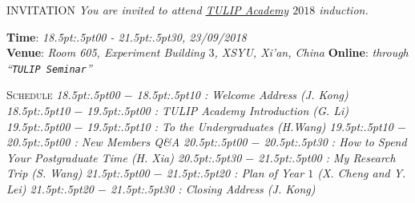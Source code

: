 \documentclass{article}
\begin{document}
%

\obeylines%

{ INVITATION}
\medbreak
\textit{%
  You are invited to attend \href{http://www.tulip.org.au}{TULIP Academy} $2018$ induction.
}


{\scshape }

\textbf{Time}:  \textit{18\kern.5pt:\kern.5pt00 - 21\kern.5pt:\kern.5pt30, 23/09/2018} \\ %
\textbf{Venue}: \textit{Room 605, Experiment Building $3$, XSYU, Xi'an, China}
\textbf{Online}: \textit{through ``\texttt{TULIP Seminar}''}

\smallbreak
{\scshape  Schedule}
\textit{%
\footnotesize{
  18\kern.5pt:\kern.5pt00 $-$ 18\kern.5pt:\kern.5pt10 : Welcome Address (J. Kong)
  18\kern.5pt:\kern.5pt10 $-$ 19\kern.5pt:\kern.5pt00 : TULIP Academy Introduction (G. Li)
  19\kern.5pt:\kern.5pt00 $-$ 19\kern.5pt:\kern.5pt10 : To the Undergraduates (H.Wang)
  19\kern.5pt:\kern.5pt10 $-$ 20\kern.5pt:\kern.5pt00 : New Members Q\&A
  20\kern.5pt:\kern.5pt00 $-$ 20\kern.5pt:\kern.5pt30 : How to Spend Your Postgraduate Time (H. Xia)
  20\kern.5pt:\kern.5pt30 $-$ 21\kern.5pt:\kern.5pt00 : My Research Trip (S. Wang)
  21\kern.5pt:\kern.5pt00 $-$ 21\kern.5pt:\kern.5pt20 : Plan of Year $1$ (X. Cheng and Y. Lei)
  21\kern.5pt:\kern.5pt20 $-$ 21\kern.5pt:\kern.5pt30 : Closing Address (J. Kong)}
}
\end{document}
